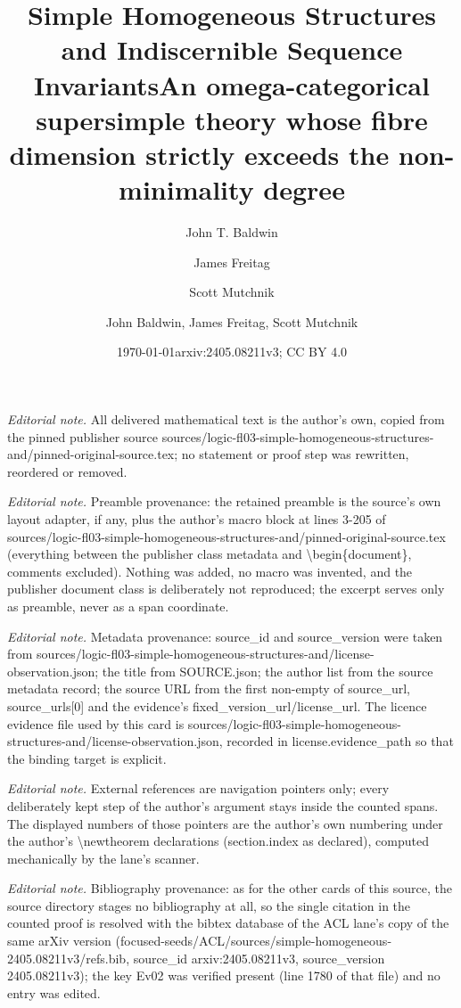 \documentclass[10pt,a4paper]{amsart}
\title{Simple Homogeneous Structures and Indiscernible Sequence Invariants}
\author[1]{John T. Baldwin}
\author[2]{James Freitag}
\author[3]{Scott Mutchnik}
\date{\today}
\title{An omega-categorical supersimple theory whose fibre dimension strictly exceeds the non-minimality degree}
\author{John Baldwin, James Freitag, Scott Mutchnik}
\date{arxiv:2405.08211v3; CC BY 4.0}
\theoremstyle{definition}
\theoremstyle{remark}
\numberwithin{equation}{section}
\begin{document}
\maketitle
\noindent\textit{Editorial note.} All delivered mathematical text is the author's own, copied from the pinned publisher source sources/logic-fl03-simple-homogeneous-structures-and/pinned-original-source.tex; no statement or proof step was rewritten, reordered or removed.\par\medskip
\noindent\textit{Editorial note.} Preamble provenance: the retained preamble is the source's own layout adapter, if any, plus the author's macro block at lines 3-205 of sources/logic-fl03-simple-homogeneous-structures-and/pinned-original-source.tex (everything between the publisher class metadata and \textbackslash{}begin\{document\}, comments excluded). Nothing was added, no macro was invented, and the publisher document class is deliberately not reproduced; the excerpt serves only as preamble, never as a span coordinate.\par\medskip
\noindent\textit{Editorial note.} Metadata provenance: source\_id and source\_version were taken from sources/logic-fl03-simple-homogeneous-structures-and/license-observation.json; the title from SOURCE.json; the author list from the source metadata record; the source URL from the first non-empty of source\_url, source\_urls[0] and the evidence's fixed\_version\_url/license\_url. The licence evidence file used by this card is sources/logic-fl03-simple-homogeneous-structures-and/license-observation.json, recorded in license.evidence\_path so that the binding target is explicit.\par\medskip
\noindent\textit{Editorial note.} External references are navigation pointers only; every deliberately kept step of the author's argument stays inside the counted spans. The displayed numbers of those pointers are the author's own numbering under the author's \textbackslash{}newtheorem declarations (section.index as declared), computed mechanically by the lane's scanner.\par\medskip
\noindent\textit{Editorial note.} Bibliography provenance: as for the other cards of this source, the source directory stages no bibliography at all, so the single citation in the counted proof is resolved with the bibtex database of the ACL lane's copy of the same arXiv version (focused-seeds/ACL/sources/simple-homogeneous-2405.08211v3/refs.bib, source\_id arxiv:2405.08211v3, source\_version 2405.08211v3); the key Ev02 was verified present (line 1780 of that file) and no entry was edited.\par\medskip
\end{document}
